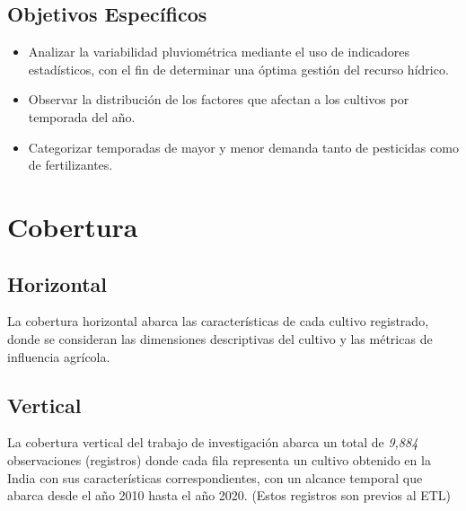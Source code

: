 \documentclass[oneside,11pt]{Latex/Classes/PhDthesisPSnPDF}
\begin{document}
\subsection{Objetivos Específicos}
\begin{itemize}
  \item{Analizar la variabilidad pluviométrica mediante el uso de indicadores estadísticos, con el fin de determinar una óptima gestión del recurso hídrico. }
  \item{Observar la distribución de los factores que afectan a los cultivos por temporada del año. }
  \item{Categorizar temporadas de mayor y menor demanda tanto de pesticidas como de fertilizantes. }
\end{itemize}

\section{Cobertura}

\subsection{Horizontal}

La cobertura horizontal abarca las características de cada cultivo
registrado, donde se consideran las dimensiones descriptivas del cultivo
y las métricas de influencia agrícola.\\

\subsection{Vertical}

La cobertura vertical del trabajo de investigación abarca un total de
\emph{9,884} observaciones (registros) donde cada fila representa un
cultivo obtenido en la India con sus características correspondientes,
con un alcance temporal que abarca desde el año 2010 hasta el año 2020.
(Estos registros son previos al ETL)
\end{document}
